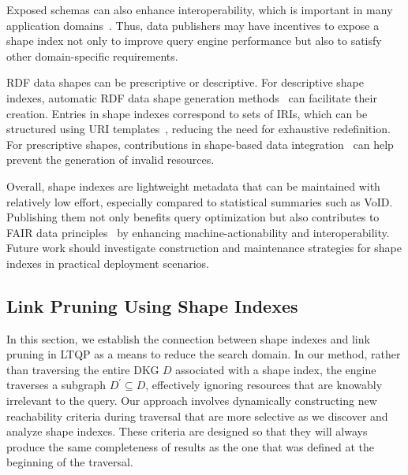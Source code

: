 Exposed schemas can also enhance interoperability, which is important in many application domains~\cite{rowland2022interoperability, solidSolidApplication, binding2016improving, roller2015benefits}. 
Thus, data publishers may have incentives to expose a shape index not only to improve query engine performance but also to satisfy other domain-specific requirements.

RDF data shapes can be prescriptive or descriptive.
For descriptive shape indexes, automatic RDF data shape generation methods~\cite{fernandez2023extracting} can facilitate their creation. 
Entries in shape indexes correspond to sets of IRIs, which can be structured using URI templates~\cite{ietf6570Template}, reducing the need for exhaustive redefinition. 
For prescriptive shapes, contributions in shape-based data integration~\cite{LabraGayo2023} can help prevent the generation of invalid resources.

Overall, shape indexes are lightweight metadata that can be maintained with relatively low effort, especially compared to statistical summaries such as VoID.
Publishing them not only benefits query optimization but also contributes to FAIR data principles~\cite{Wilkinson2016} by enhancing machine-actionability and interoperability.
Future work should investigate construction and maintenance strategies for shape indexes in practical deployment scenarios.

\subsection{Link Pruning Using Shape Indexes}\label{sec:sourceSelection}

In this section, we establish the connection between shape indexes and link pruning in LTQP as a means to reduce the search domain.
In our method, rather than traversing the entire DKG $D$ associated with a shape index, the engine traverses a subgraph $D^{\prime} \subseteq D$, effectively ignoring resources that are knowably irrelevant to the query.
Our approach involves dynamically constructing new reachability criteria during traversal that are more selective as we discover and analyze shape indexes.
These criteria are designed so that they will always produce the same completeness of results as the one that was defined at the beginning of the traversal.

\iffalse
\rt{I still think introducing time here is a really bad idea. I'm almost certain that reviewers will shoot the paper down because of this. In the formalization, let's just assume prior knowledge of all shape indexes and corresponding reachability criteria. Combining them during query execution is an implementation detail.}
More formally, let us introduce time $t$ as a factor for our reachability criteria $C_t$.
The query execution begins with an initial reachability criterion $C_0$.
At any time $t$, Equation~\ref{eq:evalQueryStructuralAssumption} must hold if we consider $C_t = C_{t+1} = C_{t+2} \dots = C_{tf}$ until the end of the execution $tf$, given that $G^{\prime}$ is produced using $C_0$.
\fi

